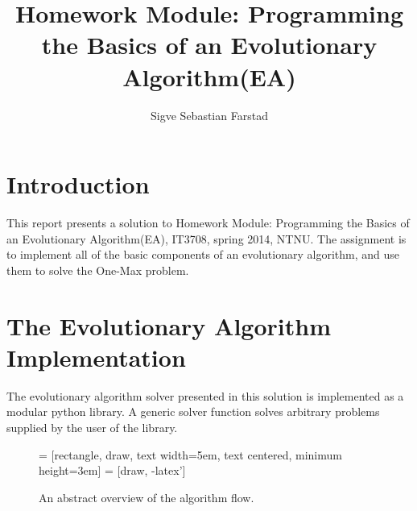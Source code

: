 \documentclass[twocolumn,oneside]{amsart}
\title{Homework Module: \textbf{Programming the Basics of an Evolutionary Algorithm(EA)}}
\author{Sigve Sebastian Farstad}
\begin{document}
\maketitle

\section{Introduction}

This report presents a solution to Homework Module: Programming the Basics of an Evolutionary Algorithm(EA), IT3708, spring 2014, NTNU.
The assignment is to implement all of the basic components of an evolutionary algorithm, and use them to solve the One-Max problem.

\section{The Evolutionary Algorithm Implementation}

The evolutionary algorithm solver presented in this solution is implemented as a modular python library.
A generic solver function solves arbitrary problems supplied by the user of the library.

\begin{figure}
 = [rectangle, draw,
        text width=5em, text centered, minimum height=3em]
 = [draw, -latex']
\caption{An abstract overview of the algorithm flow.}
\label{figure:flow}
\end{figure}
\end{document}

